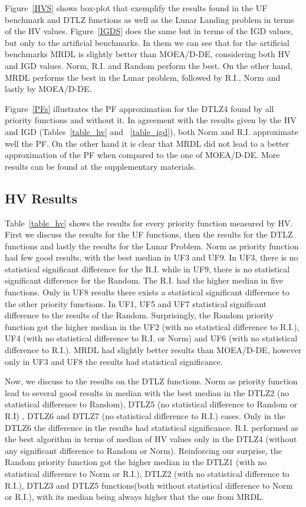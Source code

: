 Figure~\ref{HVS} shows box-plot that exemplify the results found in the UF benchmark and DTLZ functions as well as the Lunar Landing problem in terms of the HV values. Figure~\ref{IGDS} does the same but in terms of the IGD values, but only to the artificial benchmarks. In them we can see that for the artificial benchmarks MRDL is slightly better than MOEA/D-DE, considering both HV and IGD values. Norm, R.I. and Random perform the best. On the other hand, MRDL performs the best in the Lunar problem, followed by R.I., Norm and lastly by MOEA/D-DE.


Figure~\ref{PFs} illustrates the PF approximation for the DTLZ4 found by all priority functions and without it. In agreement with the results given by the HV and IGD (Tables~\ref{table_hv} and ~\ref{table_igd}), both Norm and R.I. approximate well the PF. On the other hand it is clear that MRDL did not lead to a better approximation of the PF when compared to the one of MOEA/D-DE. More results can be found at the supplementary materials.

\subsection{HV Results}

Table~\ref{table_hv} shows the results for every priority function measured by HV. First we discuss the results for the UF functions, then the results for the DTLZ functions and lastly the results for the Lunar Problem. Norm as priority function had few good results, with  the best median in UF3 and UF9. In UF3, there is no statistical significant difference for the R.I. while in UF9, there is no statistical significant difference for the Random. The R.I. had the higher median in five functions. Only in UF8 results there exists a statistical significant difference to the other priority functions.  In UF1, UF5 and UF7 statistical significant difference to the results of the Random. Surprisingly, the Random priority function got the higher median in the UF2 (with no statistical difference to R.I.), UF4 (with no statistical difference to R.I. or Norm) and UF6 (with no statistical difference to R.I.). MRDL had slightly better results than MOEA/D-DE, however only in UF3 and UF8 the results had statistical significance.

Now, we discuss to the results on the DTLZ functions. Norm as priority function lead to several good results in median with the best median in the DTLZ2 (no statistical difference to Random), DTLZ5 (no statistical difference to Random or R.I) , DTLZ6 and DTLZ7 (no statistical difference to R.I.) cases. Only in the DTLZ6 the difference in the results had statistical significance. R.I. performed as the best algorithm in terms of median of HV values only in the DTLZ4 (without any significant difference to Random or Norm). Reinforcing our surprise, the Random priority function got the higher median in the DTLZ1 (with no statistical difference to Norm or R.I.), DTLZ2 (with no statistical difference to R.I.), DTLZ3 and DTLZ5 functions(both without statistical difference to Norm or R.I.), with its median being always higher that the one from MRDL.

